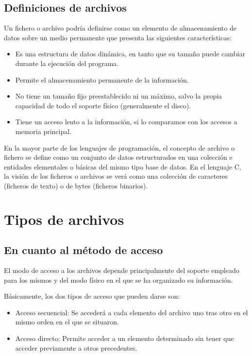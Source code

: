 \subsection{Definiciones de archivos}{
Un fichero o archivo podría definirse como un elemento de almacenamiento de datos sobre un medio permanente que presenta las siguientes características:
\begin{itemize}
	\item Es una estructura de datos dinámica, en tanto que su tamaño puede cambiar durante la ejecución del programa.
	\item Permite el almacenamiento permanente de la información.
	\item No tiene un tamaño fijo preestablecido ni un máximo, salvo la propia capacidad de todo el soporte físico (generalmente el disco).
	\item Tiene un acceso lento a la información, si lo comparamos con los accesos a memoria principal.
\end{itemize}
En la mayor parte de los lenguajes de programación, el concepto de archivo o fichero se define como un conjunto de datos estructurados en una colección e entidades elementales o básicas del mismo tipo base de datos. En el lenguaje C, la visión de los ficheros o archivos se verá como una colección de caracteres (ficheros de texto) o de bytes (ficheros binarios).
}
\section{Tipos de archivos}
\subsection{En cuanto al método de acceso}{
El modo de acceso a los archivos depende principalmente del soporte empleado para los mismos y del modo físico en el que se ha organizado su información.

Básicamente, los dos tipos de acceso que pueden darse son:
\begin{itemize}
	\item Acceso secuencial: Se accederá a cada elemento del archivo uno tras otro en el mismo orden en el que se situaron.
	\item Acceso directo: Permite acceder a un elemento determinado sin tener que acceder previamente a otros precedentes.
\end{itemize}
}
